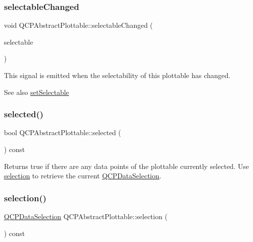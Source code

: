 \subsubsection{\texorpdfstring{selectable\+Changed}{selectableChanged}}
{\footnotesize\ttfamily void Q\+C\+P\+Abstract\+Plottable\+::selectable\+Changed (\begin{DoxyParamCaption}\item[{\mbox{\hyperlink{namespace_q_c_p_ac6cb9db26a564b27feda362a438db038}{Q\+C\+P\+::\+Selection\+Type}}}]{selectable }\end{DoxyParamCaption})\hspace{0.3cm}{\ttfamily [signal]}}

This signal is emitted when the selectability of this plottable has changed.

\begin{DoxySeeAlso}{See also}
\mbox{\hyperlink{class_q_c_p_abstract_plottable_ac238d6e910f976f1f30d41c2bca44ac3}{set\+Selectable}} 
\end{DoxySeeAlso}
\mbox{\label{class_q_c_p_abstract_plottable_a0b3b514474fe93354fc74cfc144184b4}} 
\subsubsection{\texorpdfstring{selected()}{selected()}}
{\footnotesize\ttfamily bool Q\+C\+P\+Abstract\+Plottable\+::selected (\begin{DoxyParamCaption}{ }\end{DoxyParamCaption}) const\hspace{0.3cm}{\ttfamily [inline]}}

Returns true if there are any data points of the plottable currently selected. Use \mbox{\hyperlink{class_q_c_p_abstract_plottable_a040bf09f41d456284cfd39cc37aa068f}{selection}} to retrieve the current \mbox{\hyperlink{class_q_c_p_data_selection}{Q\+C\+P\+Data\+Selection}}. \mbox{\label{class_q_c_p_abstract_plottable_a040bf09f41d456284cfd39cc37aa068f}} 
\subsubsection{\texorpdfstring{selection()}{selection()}}
{\footnotesize\ttfamily \mbox{\hyperlink{class_q_c_p_data_selection}{Q\+C\+P\+Data\+Selection}} Q\+C\+P\+Abstract\+Plottable\+::selection (\begin{DoxyParamCaption}{ }\end{DoxyParamCaption}) const\hspace{0.3cm}{\ttfamily [inline]}}

